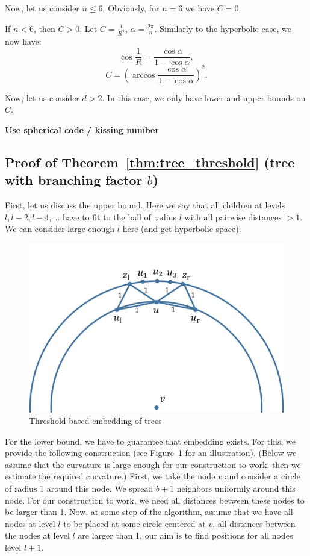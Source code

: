 \documentclass{article} %
\begin{document}
Now, let us consider $n \le 6$. Obviously, for $n = 6$ we have $C = 0$.

If $n < 6$, then $C > 0$. Let $C = \frac{1}{R^2}$, $\alpha = \frac{2\pi}{n}$. Similarly to the hyperbolic case, we now have:
\[
\cos{\frac{1}{R}} = \frac{\cos \alpha}{1 - \cos \alpha},
\]
\[
C = \left(\arccos \frac{\cos \alpha}{1 - \cos \alpha}\right)^2.
\]

Now, let us consider $d > 2$. In this case, we only have lower and upper bounds on $C$. 

\textbf{Use spherical code / kissing number} 



\subsection{Proof of Theorem~\ref{thm:tree_threshold} (tree with branching factor $b$)}

First, let us discuss the upper bound. 
Here we say that all children at levels $l, l-2, l-4, \ldots$ have to fit to the ball of radius $l$ with all pairwise distances $> 1$. We can consider large enough $l$ here (and get hyperbolic space).

\begin{figure}
    \centering
    \includegraphics[width = 0.5 \textwidth]{trees.pdf}
    \caption{Threshold-based embedding of trees}
    \label{fig:trees}
\end{figure}


For the lower bound, we have to guarantee that embedding exists. For this, we provide the following construction (see Figure~\ref{fig:trees} for an illustration).
(Below we assume that the curvature is large enough for our construction to work, then we estimate the required curvature.)
First, we take the node $v$ and consider a circle of radius 1 around this node. 
We spread $b + 1$ neighbors uniformly around this node. For our construction to work, we need all distances between these nodes to be larger than 1.
Now, at some step of the algorithm, assume that we have all nodes at level $l$ to be placed at some circle centered at $v$, all distances between the nodes at level $l$ are larger than 1, our aim is to find positions for all nodes level $l + 1$. 
\end{document}
